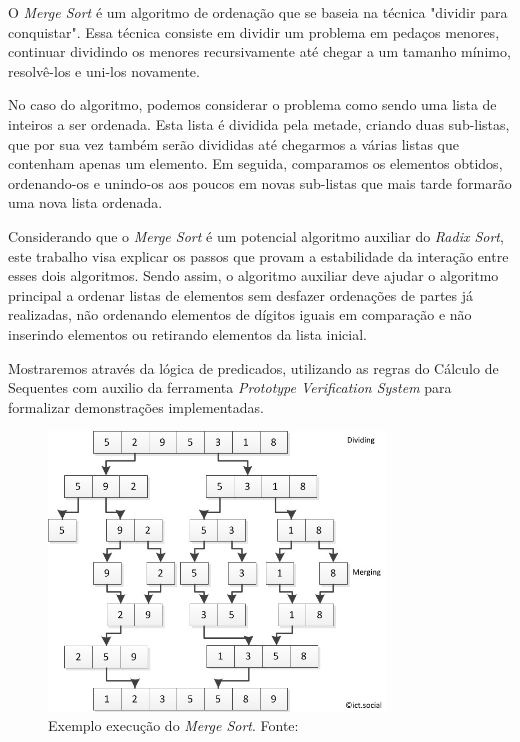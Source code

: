 \documentclass[a4paper, 12pt]{article}
\begin{document}
O \textit{Merge Sort} é um algoritmo de ordenação que se baseia na técnica "dividir para conquistar". Essa técnica consiste em dividir um problema em pedaços menores, continuar dividindo os menores recursivamente até chegar a um tamanho mínimo, resolvê-los e uni-los novamente.

No caso do algoritmo, podemos considerar o problema como sendo uma lista de inteiros a ser ordenada. Esta lista é dividida pela metade, criando duas sub-listas, que por sua vez também serão divididas até chegarmos a várias listas que contenham apenas um elemento. Em seguida, comparamos os elementos obtidos, ordenando-os e unindo-os aos poucos em novas sub-listas que mais tarde formarão uma nova lista ordenada.

Considerando que o \textit{Merge Sort} é um potencial algoritmo auxiliar do \textit{Radix Sort}, este trabalho visa explicar os passos que provam a estabilidade da interação entre esses dois algoritmos. Sendo assim, o algoritmo auxiliar deve ajudar o algoritmo principal a ordenar listas de elementos sem desfazer ordenações de partes já realizadas, não ordenando elementos de dígitos iguais em comparação e não inserindo elementos ou retirando elementos da lista inicial.

Mostraremos através da lógica de predicados, utilizando as regras do Cálculo de Sequentes com auxilio da ferramenta \textit{Prototype Verification System} para formalizar demonstrações implementadas.

\begin{figure}[!h]
\centering
\includegraphics[width=0.8\textwidth]{merge1.jpg}
\caption{Exemplo execução do \textit{Merge Sort}. Fonte: \citep{capka_ict.social_nodate}}
\label{fig:mergex1}
\end{figure}
\end{document}
